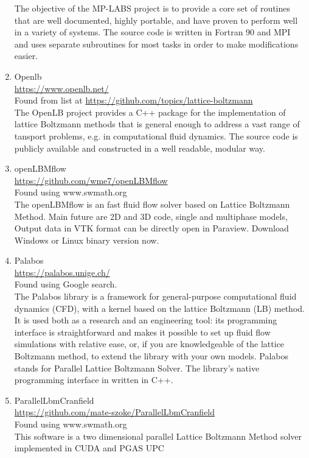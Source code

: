 \documentclass{article}
\begin{document}
\begin{enumerate}
	The objective of the MP-LABS project is to provide a core set of routines that are well documented, highly portable, and have proven to perform well in a variety of systems. The source code is written in Fortran 90 and MPI and uses separate subroutines for most tasks in order to make modifications easier.
	
	\item Openlb \\  
	\href{https://www.openlb.net/}{https://www.openlb.net/}
	\\
	Found from list at \href{https://github.com/topics/lattice-boltzmann}{https://github.com/topics/lattice-boltzmann}\\
	The OpenLB project provides a C++ package for the implementation of lattice Boltzmann methods that is general enough to address a vast range of tansport problems, e.g. in computational fluid dynamics. The source code is publicly available and constructed in a well readable, modular way. 
	
	\item openLBMflow \\
	\href{https://github.com/wme7/openLBMflow}{https://github.com/wme7/openLBMflow}\\
	Found using www.swmath.org \\
	The openLBMflow is an fast fluid flow solver based on Lattice Boltzmann Method. Main future are 2D and 3D code, single and multiphase models, Output data in VTK format can be directly open in Paraview. Download Windows or Linux binary version now.
	
	\item Palabos \\
	\href{https://palabos.unige.ch/}{https://palabos.unige.ch/}
	\\
	Found using Google search.\\
	The Palabos library is a framework for general-purpose computational fluid dynamics (CFD), with a kernel based on the lattice Boltzmann (LB) method. It is used both as a research and an engineering tool: its programming interface is straightforward and makes it possible to set up fluid flow simulations with relative ease, or, if you are knowledgeable of the lattice Boltzmann method, to extend the library with your own models. Palabos stands for Parallel Lattice Boltzmann Solver.
	The library’s native programming interface in written in C++. 
	
	\item ParallelLbmCranfield \\
	\href{https://github.com/mate-szoke/ParallelLbmCranfield}{https://github.com/mate-szoke/ParallelLbmCranfield}\\
	Found using www.swmath.org \\
	This software is a two dimensional parallel Lattice Boltzmann Method solver implemented in CUDA and PGAS UPC
	

\end{enumerate}
\end{document}
